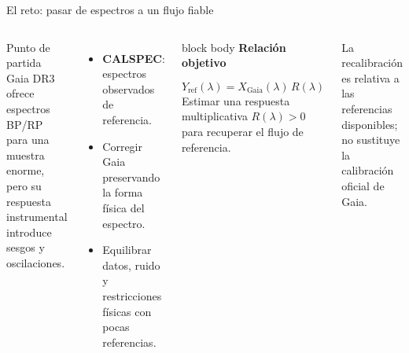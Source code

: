\documentclass[aspectratio=169,10pt]{beamer}
\begin{document}
\begin{frame}{El reto: pasar de espectros a un flujo fiable}
  \begin{columns}[T,onlytextwidth]
      \begin{block}{Punto de partida}
        Gaia DR3 ofrece espectros BP/RP para una muestra enorme, pero su
        respuesta instrumental introduce sesgos y oscilaciones.
      \end{block}
      \vspace{0.1em}
      \begin{itemize}
        \setlength{\itemsep}{0.25em}
        \item \textbf{CALSPEC}: espectros observados de referencia.
        \item Corregir Gaia preservando la forma física del espectro.
        \item Equilibrar datos, ruido y restricciones físicas con pocas referencias.
      \end{itemize}
      \begin{beamercolorbox}[wd=\linewidth,sep=1em,rounded=true]{block body}
        {\color{ULLNavy}\bfseries Relación objetivo}\par\vspace{0.5em}
        \[
          Y_{\mathrm{ref}}(\lambda)
          = X_{\mathrm{Gaia}}(\lambda)\,R(\lambda)
        \]
        {\scriptsize\color{Muted}Estimar una respuesta multiplicativa
        $R(\lambda)>0$ para recuperar el flujo de referencia.}
      \end{beamercolorbox}
      \vspace{0.5em}
      {\scriptsize\color{Muted}La recalibración es relativa a las referencias
      disponibles; no sustituye la calibración oficial de Gaia.}
  \end{columns}
\end{frame}
\end{document}
